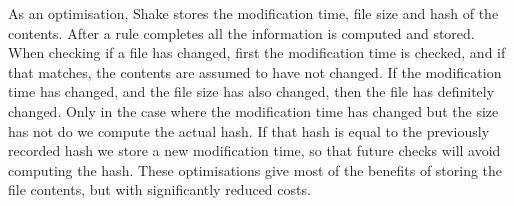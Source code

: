 As an optimisation, Shake stores the modification time, file size and hash of
the contents. After a rule completes all the information is computed and stored.
When checking if a file has changed, first the modification time is checked, and
if that matches, the contents are assumed to have not changed. If the
modification time has changed, and the file size has also changed, then the file
has definitely changed. Only in the case where the modification time has changed
but the size has not do we compute the actual hash. If that hash is equal to the
previously recorded hash we store a new modification time, so that future checks
will avoid computing the hash. These optimisations give most of the benefits of
storing the file contents, but with significantly reduced costs.
